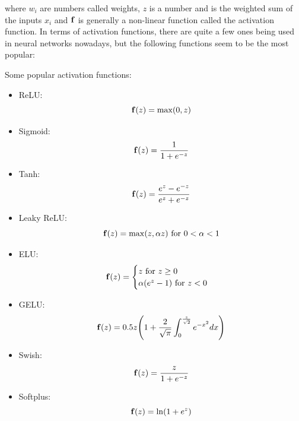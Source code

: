 \documentclass[14pt, a4paper]{article}
\numberwithin{equation}{section}
\numberwithin{algorithm}{section}
\numberwithin{figure}{section}
\begin{document}
where $w_i$ are numbers called weights, $z$ is a number and is the weighted sum of the inputs $x_i$ and $\bold{f}$ is generally a non-linear function called the activation function.
In terms of activation functions, there are quite a few ones being used in neural networks nowadays, but the following functions seem to be the most popular:

Some popular activation functions:

\begin{itemize}
  \item ReLU:
  \begin{equation*}
    \bold{f}(z) = \max(0, z)
  \end{equation*}
  \item Sigmoid:
  \begin{equation*}
    \bold{f}(z) = \dfrac{1}{1 + e^{-z}}
  \end{equation*}
  \item Tanh:
  \begin{equation*}
    \bold{f}(z) = \dfrac{e^z - e^{-z}}{e^z + e^{-z}}
  \end{equation*}
  \item Leaky ReLU:
  \begin{equation*}
    \bold{f}(z)=\max(z, \alpha z) \text{ for } 0 < \alpha < 1
  \end{equation*}
  \item ELU:
  \begin{equation*}
    \bold{f}(z) = \begin{cases} z \text{ for } z \geq 0 \\ \alpha (e^z - 1) \text{ for } z < 0 \end{cases}
  \end{equation*}
  \item GELU:
  \begin{equation*}
    \bold{f}(z)=0.5 z \Bigg( 1 + \dfrac{2}{\sqrt{\pi}} \int_0^{\frac{z}{\sqrt{2}}} e^{-x^2}dx \Bigg)
  \end{equation*}
  \item Swish:
  \begin{equation*}
    \bold{f}(z) = \dfrac{z}{1 + e^{-z}}
  \end{equation*}
  \item Softplus:
  \begin{equation*}
    \bold{f}(z) = \ln(1 + e^z)
  \end{equation*}
\end{itemize}
\end{document}
